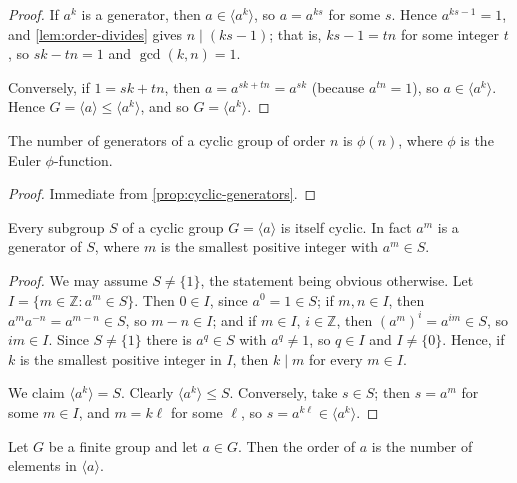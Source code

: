 \begin{proof}
	If \(a^k\) is a generator, then \(a \in \langle a^k\rangle\), so \(a = a^{ks}\) for some
	\(s\). Hence \(a^{ks-1} = 1\), and \autoref{lem:order-divides} gives
	\(n \mid (ks-1)\); that is, \(ks - 1 = tn\) for some integer \(t\), so
	\(sk - tn = 1\) and \(\gcd(k,n) = 1\).

	Conversely, if \(1 = sk + tn\), then \(a = a^{sk+tn} = a^{sk}\) (because \(a^{tn} = 1\)),
	so \(a \in \langle a^k\rangle\). Hence
	\(G = \langle a\rangle \leq \langle a^k\rangle\), and so \(G = \langle a^k\rangle\).
\end{proof}

\begin{corollary}\label{cor:number-of-generators}
	The number of generators of a cyclic group of order \(n\) is \(\phi(n)\), where
	\(\phi\) is the Euler \(\phi\)-function.
\end{corollary}

\begin{proof}
	Immediate from \autoref{prop:cyclic-generators}.
\end{proof}

\begin{proposition}\label{prop:subgroup-of-cyclic}
	Every subgroup \(S\) of a cyclic group \(G = \langle a\rangle\) is itself cyclic. In
	fact \(a^m\) is a generator of \(S\), where \(m\) is the smallest positive integer with
	\(a^m \in S\).
\end{proposition}

\begin{proof}
	We may assume \(S \neq \{1\}\), the statement being obvious otherwise. Let
	\(I = \{m \in \mathbb{Z} : a^m \in S\}\). Then \(0 \in I\), since \(a^0 = 1 \in S\); if
	\(m, n \in I\), then \(a^m a^{-n} = a^{m-n} \in S\), so \(m - n \in I\); and if
	\(m \in I\), \(i \in \mathbb{Z}\), then \((a^m)^i = a^{im} \in S\), so \(im \in I\).
	Since \(S \neq \{1\}\) there is \(a^q \in S\) with \(a^q \neq 1\), so \(q \in I\) and
	\(I \neq \{0\}\). Hence, if \(k\) is the smallest positive integer in \(I\), then
	\(k \mid m\) for every \(m \in I\).

	We claim \(\langle a^k\rangle = S\). Clearly \(\langle a^k\rangle \leq S\). Conversely,
	take \(s \in S\); then \(s = a^m\) for some \(m \in I\), and \(m = k\ell\) for some
	\(\ell\), so \(s = a^{k\ell} \in \langle a^k \rangle\).
\end{proof}

\begin{proposition}\label{prop:order-equals-size}
	Let \(G\) be a finite group and let \(a \in G\). Then the order of \(a\) is the number
	of elements in \(\langle a\rangle\).
\end{proposition}

